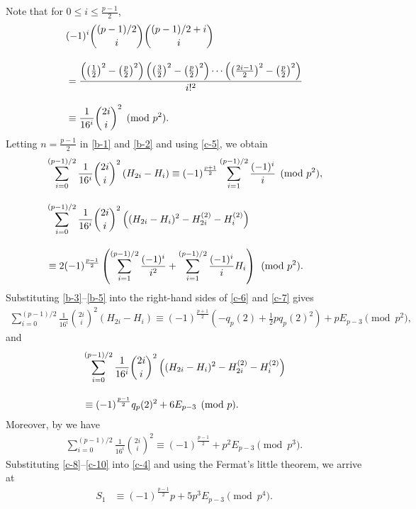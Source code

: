 \documentclass[12pt]{article}
\numberwithin{equation}{section}
\begin{document}
Note that for $0\le i\le \frac{p-1}{2}$,
\begin{align}
&(-1)^i{(p-1)/2\choose i}{(p-1)/2+i\choose i}\notag\\[10pt]
&=\frac{\left(\left(\frac{1}{2}\right)^2-\left(\frac{p}{2}\right)^2\right)
\left(\left(\frac{3}{2}\right)^2-\left(\frac{p}{2}\right)^2\right)\cdots
\left(\left(\frac{2i-1}{2}\right)^2-\left(\frac{p}{2}\right)^2\right)}{i!^2}\notag\\[10pt]
&\equiv \frac{1}{16^i}{2i\choose i}^2\pmod{p^2}.\label{c-5}
\end{align}
Letting $n=\frac{p-1}{2}$ in \eqref{b-1} and \eqref{b-2} and using \eqref{c-5}, we obtain
\begin{align}
&\sum_{i=0}^{(p-1)/2}\frac{1}{16^i}{2i\choose i}^2\left(H_{2i}-H_i\right)
\equiv (-1)^{\frac{p+1}{2}}\sum_{i=1}^{(p-1)/2}\frac{(-1)^i}{i}\pmod{p^2},\label{c-6}\\[10pt]
&\sum_{i=0}^{(p-1)/2}\frac{1}{16^i}{2i\choose i}^2
\left((H_{2i}-H_i)^2-H_{2i}^{(2)}-H_i^{(2)}\right)\notag\\[10pt]
&\equiv 2(-1)^{\frac{p-1}{2}}\left(\sum_{i=1}^{(p-1)/2}\frac{(-1)^i}{i^2}+\sum_{i=1}^{(p-1)/2}\frac{(-1)^i}{i}H_i\right)\pmod{p^2}.
\label{c-7}
\end{align}
Substituting \eqref{b-3}--\eqref{b-5} into the right-hand sides of \eqref{c-6} and \eqref{c-7} gives
\begin{align}
\sum_{i=0}^{(p-1)/2}\frac{1}{16^i}{2i\choose i}^2\left(H_{2i}-H_i\right)
\equiv (-1)^{\frac{p+1}{2}}\left(-q_p(2)+\frac{1}{2}pq_p(2)^2\right)+pE_{p-3}\pmod{p^2},
\label{c-8}
\end{align}
and
\begin{align}
&\sum_{i=0}^{(p-1)/2}\frac{1}{16^i}{2i\choose i}^2
\left((H_{2i}-H_i)^2-H_{2i}^{(2)}-H_i^{(2)}\right)\notag\\[10pt]
&\equiv (-1)^{\frac{p-1}{2}}q_p(2)^2+6E_{p-3}\pmod{p}.\label{c-9}
\end{align}
Moreover, by \cite[(1.7)]{sunzw-scm-2011} we have
\begin{align}
\sum_{i=0}^{(p-1)/2}\frac{1}{16^i}{2i\choose i}^2\equiv (-1)^{\frac{p-1}{2}}+p^2E_{p-3}\pmod{p^3}.
\label{c-10}
\end{align}
Substituting \eqref{c-8}--\eqref{c-10} into \eqref{c-4} and using the Fermat's little theorem, we arrive at
\begin{align}
S_1&\equiv (-1)^{\frac{p-1}{2}}p+5p^3E_{p-3}\pmod{p^4}.\label{c-11}
\end{align}
\end{document}
